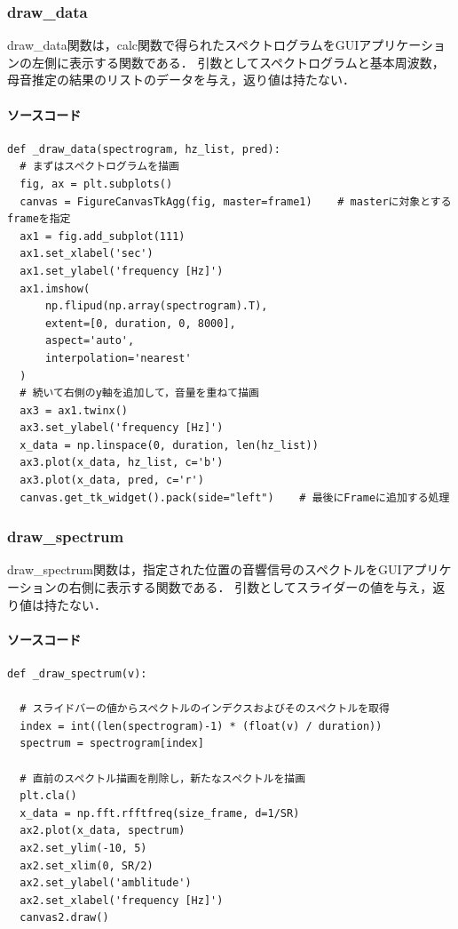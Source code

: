 \documentclass[11pt,a4j]{jarticle}%
\begin{document}
\subsubsection{draw\_data}
draw\_data関数は，calc関数で得られたスペクトログラムをGUIアプリケーションの左側に表示する関数である．
引数としてスペクトログラムと基本周波数，母音推定の結果のリストのデータを与え，返り値は持たない．
\paragraph*{ソースコード}
\begin{lstlisting}[caption=draw\_data関数,label=openfile]
def _draw_data(spectrogram, hz_list, pred):
  # まずはスペクトログラムを描画
  fig, ax = plt.subplots()
  canvas = FigureCanvasTkAgg(fig, master=frame1)    # masterに対象とするframeを指定
  ax1 = fig.add_subplot(111)
  ax1.set_xlabel('sec')
  ax1.set_ylabel('frequency [Hz]')
  ax1.imshow(
      np.flipud(np.array(spectrogram).T),
      extent=[0, duration, 0, 8000],
      aspect='auto',
      interpolation='nearest'
  )
  # 続いて右側のy軸を追加して，音量を重ねて描画
  ax3 = ax1.twinx()
  ax3.set_ylabel('frequency [Hz]')
  x_data = np.linspace(0, duration, len(hz_list))
  ax3.plot(x_data, hz_list, c='b')
  ax3.plot(x_data, pred, c='r')
  canvas.get_tk_widget().pack(side="left")    # 最後にFrameに追加する処理
\end{lstlisting}
\subsubsection{draw\_spectrum}
draw\_spectrum関数は，指定された位置の音響信号のスペクトルをGUIアプリケーションの右側に表示する関数である．
引数としてスライダーの値を与え，返り値は持たない．
\paragraph*{ソースコード}
\begin{lstlisting}[caption=\_draw\_spectrum関数,label=openfile]
def _draw_spectrum(v):

  # スライドバーの値からスペクトルのインデクスおよびそのスペクトルを取得
  index = int((len(spectrogram)-1) * (float(v) / duration))
  spectrum = spectrogram[index]

  # 直前のスペクトル描画を削除し，新たなスペクトルを描画
  plt.cla()
  x_data = np.fft.rfftfreq(size_frame, d=1/SR)
  ax2.plot(x_data, spectrum)
  ax2.set_ylim(-10, 5)
  ax2.set_xlim(0, SR/2)
  ax2.set_ylabel('amblitude')
  ax2.set_xlabel('frequency [Hz]')
  canvas2.draw()

\end{lstlisting}
\end{document}
